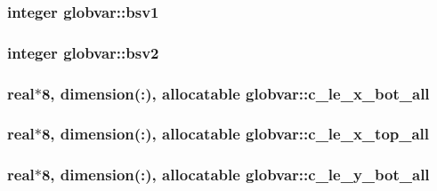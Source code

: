 \subsubsection[{bsv1}]{\setlength{\rightskip}{0pt plus 5cm}integer globvar\+::bsv1}\label{namespaceglobvar_af5f7b2251f75b81eeb565207d1b40aab}
\hypertarget{namespaceglobvar_a50c172f04174a319fcbf69991adb2a97}{}
\subsubsection[{bsv2}]{\setlength{\rightskip}{0pt plus 5cm}integer globvar\+::bsv2}\label{namespaceglobvar_a50c172f04174a319fcbf69991adb2a97}
\hypertarget{namespaceglobvar_aec9bec955f6acfec428227dba9b7853d}{}
\subsubsection[{c\+\_\+le\+\_\+x\+\_\+bot\+\_\+all}]{\setlength{\rightskip}{0pt plus 5cm}real$\ast$8, dimension(\+:), allocatable globvar\+::c\+\_\+le\+\_\+x\+\_\+bot\+\_\+all}\label{namespaceglobvar_aec9bec955f6acfec428227dba9b7853d}
\hypertarget{namespaceglobvar_a402f13249e098adf069fdb47247cc952}{}
\subsubsection[{c\+\_\+le\+\_\+x\+\_\+top\+\_\+all}]{\setlength{\rightskip}{0pt plus 5cm}real$\ast$8, dimension(\+:), allocatable globvar\+::c\+\_\+le\+\_\+x\+\_\+top\+\_\+all}\label{namespaceglobvar_a402f13249e098adf069fdb47247cc952}
\hypertarget{namespaceglobvar_a1e99d4cf7e322ee5f4febfa67e23249a}{}
\subsubsection[{c\+\_\+le\+\_\+y\+\_\+bot\+\_\+all}]{\setlength{\rightskip}{0pt plus 5cm}real$\ast$8, dimension(\+:), allocatable globvar\+::c\+\_\+le\+\_\+y\+\_\+bot\+\_\+all}\label{namespaceglobvar_a1e99d4cf7e322ee5f4febfa67e23249a}
\hypertarget{namespaceglobvar_a3675f2363320e97186b54bdf83c57fe0}{}
